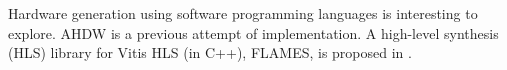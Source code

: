 Hardware generation using software programming languages is interesting to explore.
AHDW \cite{zhao2023automatic} is a previous attempt of implementation.
A high-level synthesis (HLS) library for Vitis HLS (in C++), FLAMES,
is proposed in \cite{zhao2024flexible}.
